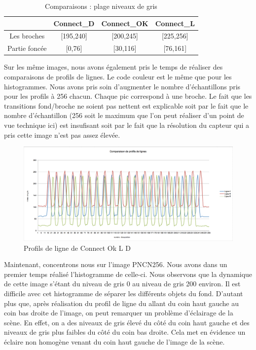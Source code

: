 \documentclass{scrreprt}
\begin{document}
\begin{table}[!h]
	\begin{center}
		\begin{tabular}{|c|c|c|c|}
		   \hline
		   & Connect_D & Connect_OK & Connect_L \\
		   \hline
		   Les broches & [195,240]& [200,245] & [225,256]\\
		   \hline
		   Partie foncée & [0,76] & [30,116] & [76,161]\\
		   \hline
		\end{tabular}
	\end{center}
	\caption{Comparaisons : plage niveaux de gris}
\end{table}

\newpage
Sur les même images, nous avons également pris le temps de réaliser des comparaisons de profils de lignes. Le code couleur est le même
que pour les histogrammes. Nous avons pris soin d'augmenter le nombre d'échantillons pris pour les profils à 256 chacun. Chaque pic 
correspond à une broche. Le fait que les transitions fond/broche ne soient pas nettent est explicable soit par le fait que le nombre
d'échantillon (256 soit le maximum que l'on peut réaliser d'un point de vue technique ici) est insufisant soit par le fait que la résolution
du capteur qui a pris cette image n'est pas assez élevée.

\begin{figure}[!h]
\centering
\includegraphics[width=15cm]{images/profildeligne1.png}
\caption{Profils de ligne de Connect Ok L D}
\end{figure}

\newpage
Maintenant, concentrons nous sur l'image PNCN256. Nous avons dans un premier temps réalisé l'histogramme de celle-ci. Nous observons que 
la dynamique de cette image s'étant du niveau de gris 0 au niveau de gris 200 environ. Il est difficile avec cet histogramme de séparer
les différents objets du fond. D'autant plus que, après réalisation du profil de ligne du allant du coin haut gauche au coin bas droite de l'image, on peut remarquer un problème 
d'éclairage de la scène. En effet, on a des niveaux de gris élevé du côté du coin haut gauche et des niveaux de gris plus faibles du côté 
du coin bas droite. Cela met en évidence un éclaire non homogène venant du coin haut gauche de l'image de la scène. 
  
\end{document}
